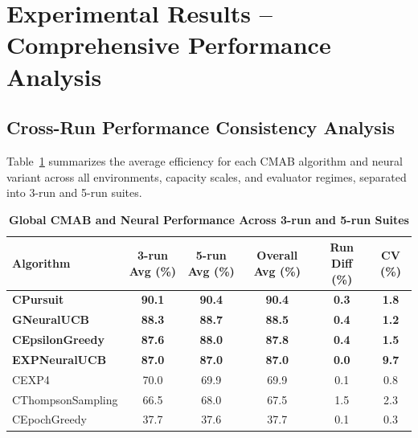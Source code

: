 \documentclass[12pt,a4paper]{article}
\newcommand{\performance}[1]{\textcolor{performancecolor}{\textbf{#1}}}
\newcommand{\legacy}[1]{\textcolor{legacycolor}{\textbf{#1}}}
\newcommand{\neural}[1]{\textcolor{neuralcolor}{\textbf{#1}}}
\begin{document}
\section{Experimental Results – Comprehensive Performance Analysis}

\begin{tcolorbox}[colback=performancecolor!10,colframe=performancecolor,title=\textbf{Primary Performance Results (Aggregated Across Capacities, Environments, and Regimes)}]
\small
\subsection{Cross-Run Performance Consistency Analysis}

Table~\ref{tab:global-performance} summarizes the average efficiency for each CMAB algorithm and neural variant across all environments, capacity scales, and evaluator regimes, separated into 3-run and 5-run suites.

\begin{table}[H]
\small
\centering
\caption{\performance{Global CMAB and Neural Performance Across 3-run and 5-run Suites}}
\label{tab:global-performance}
\begin{tabular}{|l|c|c|c|c|c|}
\hline
\textbf{Algorithm} & \textbf{3-run Avg (\%)} & \textbf{5-run Avg (\%)} & \textbf{Overall Avg (\%)} & \textbf{Run Diff (\%)} & \textbf{CV (\%)} \\
\hline
\hline
\performance{CPursuit}        & \performance{90.1} & \performance{90.4} & \performance{90.4} & \performance{0.3} & \performance{1.8} \\
\neural{GNeuralUCB}          & \neural{88.3} & \neural{88.7} & \neural{88.5} & \neural{0.4} & \neural{1.2} \\
\performance{CEpsilonGreedy} & \performance{87.6} & \performance{88.0} & \performance{87.8} & \performance{0.4} & \performance{1.5} \\
\legacy{EXPNeuralUCB}        & \legacy{87.0}     & \legacy{87.0}     & \legacy{87.0} & \legacy{0.0} & \legacy{9.7} \\
CEXP4                        & 70.0              & 69.9              & 69.9 & 0.1 & 0.8 \\
CThompsonSampling            & 66.5              & 68.0              & 67.5 & 1.5 & 2.3 \\
CEpochGreedy                 & 37.7              & 37.6              & 37.7 & 0.1 & 0.3 \\
\hline
\end{tabular}
\end{table}


\end{tcolorbox}
\end{document}
